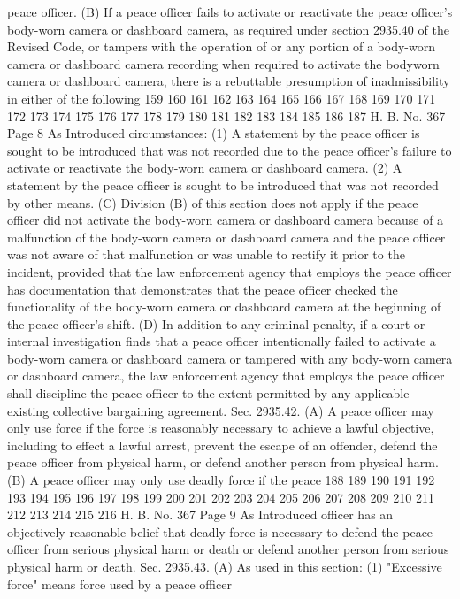 peace officer.
(B) If a peace officer fails to activate or reactivate the
peace officer's body-worn camera or dashboard camera, as
required under section 2935.40 of the Revised Code, or tampers
with the operation of or any portion of a body-worn camera or
dashboard camera recording when required to activate the bodyworn camera or dashboard camera, there is a rebuttable
presumption of inadmissibility in either of the following
159
160
161
162
163
164
165
166
167
168
169
170
171
172
173
174
175
176
177
178
179
180
181
182
183
184
185
186
187
H. B. No. 367 Page 8
As Introduced
circumstances:
(1) A statement by the peace officer is sought to be
introduced that was not recorded due to the peace officer's
failure to activate or reactivate the body-worn camera or
dashboard camera.
(2) A statement by the peace officer is sought to be
introduced that was not recorded by other means.
(C) Division (B) of this section does not apply if the
peace officer did not activate the body-worn camera or dashboard
camera because of a malfunction of the body-worn camera or
dashboard camera and the peace officer was not aware of that
malfunction or was unable to rectify it prior to the incident,
provided that the law enforcement agency that employs the peace
officer has documentation that demonstrates that the peace
officer checked the functionality of the body-worn camera or
dashboard camera at the beginning of the peace officer's shift.
(D) In addition to any criminal penalty, if a court or
internal investigation finds that a peace officer intentionally
failed to activate a body-worn camera or dashboard camera or
tampered with any body-worn camera or dashboard camera, the law
enforcement agency that employs the peace officer shall
discipline the peace officer to the extent permitted by any
applicable existing collective bargaining agreement.
 Sec. 2935.42. (A) A peace officer may only use force if
the force is reasonably necessary to achieve a lawful objective,
including to effect a lawful arrest, prevent the escape of an
offender, defend the peace officer from physical harm, or defend
another person from physical harm.
(B) A peace officer may only use deadly force if the peace
188
189
190
191
192
193
194
195
196
197
198
199
200
201
202
203
204
205
206
207
208
209
210
211
212
213
214
215
216
H. B. No. 367 Page 9
As Introduced
officer has an objectively reasonable belief that deadly force
is necessary to defend the peace officer from serious physical
harm or death or defend another person from serious physical
harm or death.
 Sec. 2935.43. (A) As used in this section:
(1) "Excessive force" means force used by a peace officer
